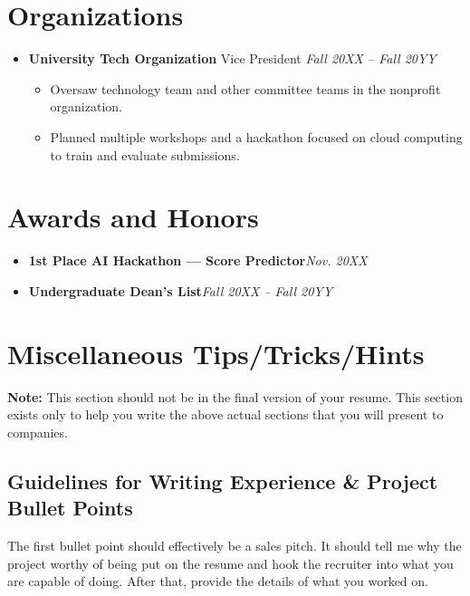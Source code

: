 \documentclass[letterpaper, 10pt]{article}
\newcommand{\job}[4]{\textbf{#1} #2 \hfill\textit{#3}#4}
\newcommand{\award}[2]{\textbf{#1}\hfill\textit{#2}}
\begin{document}
\section{Organizations}%
\begin{itemize}[leftmargin=0pt]
    \item[]
        \job
        {University Tech Organization}
        {Vice President}
        {Fall 20XX -- Fall 20YY}
        {\begin{itemize}
            \item Oversaw technology team and other committee teams in the
                nonprofit organization.
            \item Planned multiple workshops and a hackathon focused on cloud
                computing to train and evaluate submissions.
        \end{itemize}
        }
\end{itemize}%
\section{Awards and Honors}%
\begin{itemize}[leftmargin=0pt]
    \item[]
        \award
        {1st Place AI Hackathon --- Score Predictor}
        {Nov. 20XX}
    \item[]
        \award
        {Undergraduate Dean's List} %
        {Fall 20XX -- Fall 20YY}
\end{itemize}%


\newpage
\section{Miscellaneous Tips/Tricks/Hints}%
\textbf{Note:} This section should not be in the final version of your resume.
This section exists only to help you write the above actual sections that you
will present to companies.

\subsection*{Guidelines for Writing Experience \& Project Bullet Points}
The first bullet point should effectively be a sales pitch. It should tell me
why the project worthy of being put on the resume and hook the recruiter into
what you are capable of doing. After that, provide the details of what you
worked on.
\end{document}
